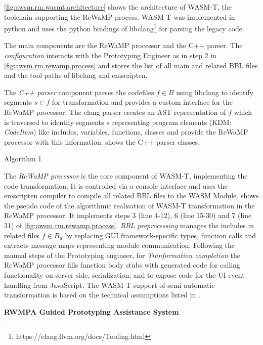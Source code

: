 \cref{fig:awsm.rm.wasmt.architecture} shows the architecture of WASM-T, the toolchain supporting the ReWaMP process.
WASM-T was implemented in python and uses the python bindings of libclang\footnote{https://clang.llvm.org/docs/Tooling.html} for parsing the legacy code.

The main components are the ReWaMP processor and the C++ parser.
The \emph{configuration} interacts with the Prototyping Engineer as in step 2 in \cref{fig:awsm.rm.rewamp.process} and stores the list of all main and related BBL files and the tool paths of libclang and emscripten.

The \emph{C++ parser} component parses the codefiles \(f\in B\) using libclang to identify segments \(s \in f\) for transformation and provides a custom interface for the ReWaMP processor.
The clang parser creates an AST representation of \(f\) which is traversed to identify segments \(s\) representing program elements (KDM: \emph{CodeItem}) like includes, variables, functions, classes and provide the ReWaMP processor with this information.
 shows the C++ parser classes.

Algorithm 1

The \emph{ReWaMP processor} is the core component of WASM-T, implementing the code transformation.
It is controlled via a console interface and uses the emscripten compiler to compile all related BBL files to the WASM Module.
\autocite{alg:rwmp} shows the pseudo code of the algorithmic realisation of WASM-T transformation in the ReWaMP processor.
It implements steps 3 (line 4-12), 6 (line 15-30) and 7 (line 31) of \cref{fig:awsm.rm.rewamp.process}.
\emph{BBL preprocessing} manages the includes in related files \(f \in B_u\) by replacing GUI framework-specific types, function calls and extracts message maps representing module communication.
Following the manual steps of the Prototyping engineer, for \emph{Tranformation completion} the ReWaMP processor fills function body stubs with generated code for calling functionality on server side, serialization, and to expose code for the UI event handling from JavaScript.
The WASM-T support of semi-automatic transformation is based on the technical assumptions listed in \autocite{tab:rewamp-assump}.

\textbf{RWMPA Guided Prototyping Assistance System}

